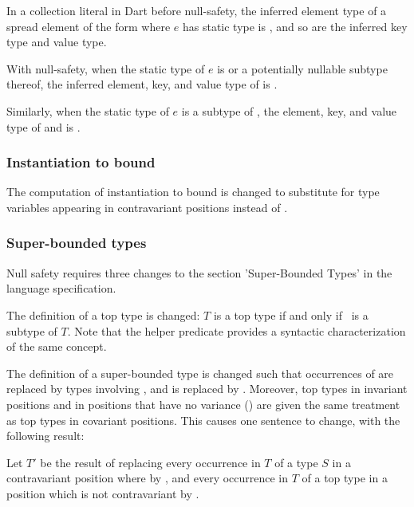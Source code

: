 \documentclass[makeidx]{article}
\begin{document}
{In a collection literal in Dart before null-safety, the inferred element
type of a spread element of the form  where $e$ has static type
 is , and so are the inferred key type and value type.

With null-safety, when the static type of $e$ is  or a potentially
nullable subtype thereof, the inferred element, key, and value type
of  is .

Similarly, when the static type of $e$ is a subtype of ,
the element, key, and value type of  and  is .


\subsubsection{Instantiation to bound}

The computation of instantiation to bound is changed to substitute  for
type variables appearing in contravariant positions instead of .

\subsubsection{Super-bounded types}

Null safety requires three changes to the section 'Super-Bounded Types' in
the language specification.

The definition of a top type is changed: $T$ is a top type if and only if
\ is a subtype of $T$. Note that the helper predicate \IsTopTypeName{}
provides a syntactic characterization of the same concept.

The definition of a super-bounded type is changed such that occurrences of
 are replaced by types involving , and  is replaced by
. Moreover, top types in invariant positions and in positions that
have no variance () are given the
same treatment as top types in covariant positions. This causes one
sentence to change, with the following result:

Let $T'$ be the result of replacing every occurrence in $T$ of a type $S$
in a contravariant position where  by , and every
occurrence in $T$ of a top type in a position which is not contravariant by
.

}
\end{document}
